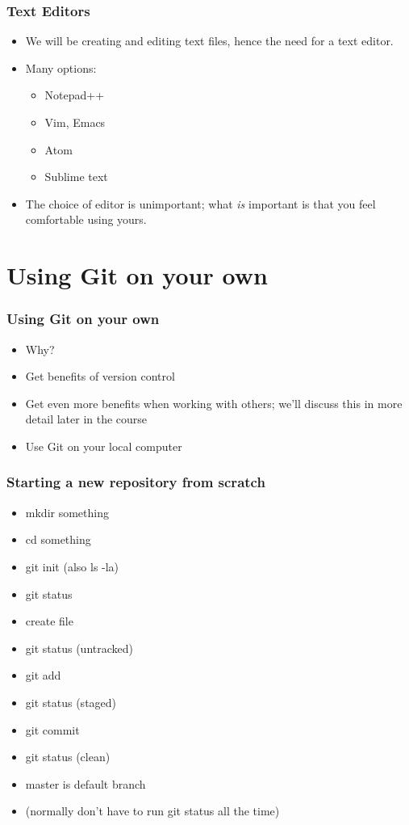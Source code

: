 \documentclass{git_course}
\begin{document}
\begin{frame}
\frametitle{Text Editors}
\begin{itemize}
    \item We will be creating and editing text files, hence the need for a
        text editor.
    \item Many options:
    \begin{itemize}
        \item Notepad++
        \item Vim, Emacs
        \item Atom
        \item Sublime text
    \end{itemize}
    \item The choice of editor is unimportant; what \emph{is} important is
        that you feel comfortable using yours.
\end{itemize}
\end{frame}

\section{Using Git on your own}

\begin{frame}
\frametitle{Using Git on your own}
\begin{itemize}
    \item Why?
    \item Get benefits of version control
    \item Get even more benefits when working with others; we'll discuss
        this in more detail later in the course
    \item Use Git on your local computer
\end{itemize}
\end{frame}

\begin{frame}
\frametitle{Starting a new repository from scratch}
\begin{itemize}
    \item mkdir something
    \item cd something
    \item git init  (also ls -la)
    \item git status
    \item create file
    \item git status (untracked)
    \item git add
    \item git status (staged)
    \item git commit
    \item git status (clean)
    \item master is default branch
    \item (normally don't have to run git status all the time)
\end{itemize}
\end{frame}
\end{document}
